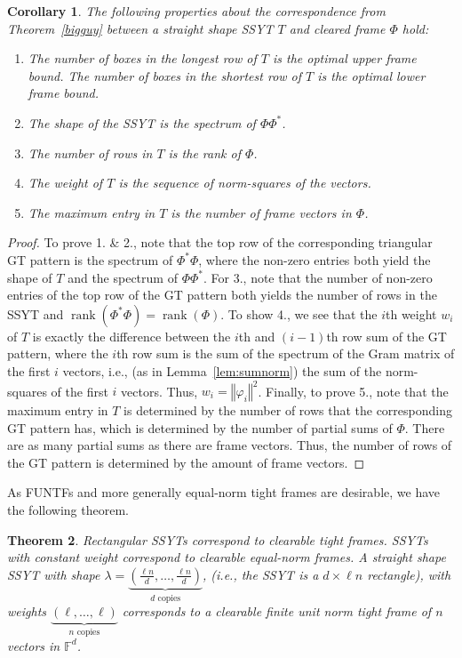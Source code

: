 \documentclass[10pt]{article}
\theoremstyle{plain}
\newtheorem{thm}{Theorem}[section]
\newtheorem{corollary}[thm]{Corollary}
\theoremstyle{definition}
\newcommand{\frameop}{\Phi\Phi^\ast}
\newcommand{\gram}{\Phi^\ast\Phi}
\newcommand{\bF}{\mathbb{F}}
\newcommand{\norm}[1]{\left\Vert#1\right\Vert}
\newcommand{\rk}{\operatorname{rank}}
\begin{document}
\begin{corollary}\label{cor:SSYTprops}
The following properties about the correspondence from Theorem~\ref{bigguy} between a straight shape SSYT $T$ and cleared frame $\Phi$ hold: 
\begin{enumerate}
\item The number of boxes in the longest row of $T$ is the optimal upper frame bound.  The number of boxes in the shortest row of $T$ is the optimal lower frame bound.
\item The shape of the SSYT is the spectrum of $\frameop$.
\item The number of rows in $T$ is the rank of $\Phi$.
\item The weight of $T$ is the sequence of norm-squares of the vectors.
\item The maximum entry in $T$ is the number of frame vectors in $\Phi$.
\end{enumerate}
\end{corollary}

\begin{proof} 
To prove 1. \& 2., note that the top row of the corresponding triangular GT pattern is the spectrum of $\gram$, where the non-zero entries both yield the shape of $T$ and the spectrum of $\frameop$. For 3., note that the number of non-zero entries of the top row of the GT pattern both yields the number of rows in the SSYT and $\rk(\gram)=\rk(\Phi)$. To show 4., we see that the $i$th weight $w_i$ of $T$ is exactly the difference between the $i$th and $(i-1)$th row sum of the GT pattern, where the $i$th row sum is the sum of the spectrum of the Gram matrix of the first $i$ vectors, i.e., (as in Lemma~\ref{lem:sumnorm}) the sum of the norm-squares of the first $i$ vectors.  Thus, $w_i = \norm{\varphi_i}^2$.
 Finally, to prove 5., note that the maximum entry in $T$ is determined by the number of rows that the corresponding GT pattern has, which is determined by the number of partial sums of $\Phi$. There are as many partial sums as there are frame vectors. Thus, the number of rows of the GT pattern is determined by the amount of frame vectors. 
\end{proof}

As FUNTFs and more generally equal-norm tight frames are desirable, we have the following theorem.

\begin{thm}\label{ssyt2funtf}
Rectangular SSYTs correspond to clearable tight frames. SSYTs with constant weight correspond to clearable equal-norm frames.  
A straight shape SSYT with shape $\lambda  = \underbrace{(\frac{\ell n}{d}, \dots, \frac{\ell n}{d})}_{d \text{ copies}}$, (i.e., the SSYT is a $d \times \ell n $ rectangle), with weights $\underbrace{(\ell, \dots, \ell)}_{n \text{ copies}}$ corresponds to a clearable finite unit norm tight frame of $n$ vectors in $\bF^d$. 
\end{thm}
\end{document}
